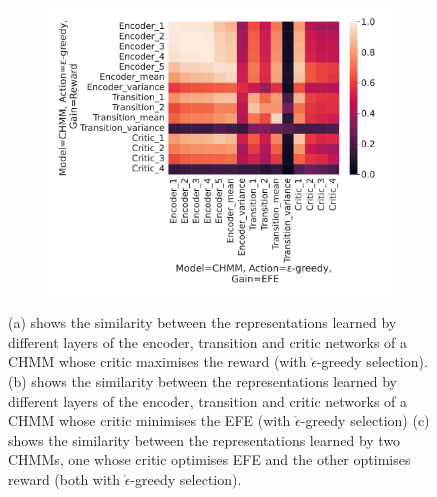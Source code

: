 \documentclass[twoside,11pt]{article}
\begin{document}
\begin{figure}[H]
\begin{subfigure}{.3\textwidth}
    \end{subfigure}%
    \begin{subfigure}{.3\textwidth}
        \centering
        \includegraphics[draft=false,width=\linewidth]{cka_figures/CKA_chmm_73_chmm_77}
        \caption{}\label{sfig:cka-chmm-chmm2}
    \end{subfigure}

    \caption{(a) shows the similarity between the representations learned by different layers of the encoder, transition and critic networks of a CHMM whose critic maximises the reward (with $\mathring{\epsilon}$-greedy selection).
        (b) shows the similarity between the representations learned by different layers of the encoder, transition and critic networks of a CHMM whose critic minimises the EFE (with $\mathring{\epsilon}$-greedy selection)
        (c) shows the similarity between the representations learned by two CHMMs, one whose critic optimises EFE and the other optimises reward (both with $\mathring{\epsilon}$-greedy selection).
    }
    \label{fig:cka-chmm}
\end{figure}
\end{document}
